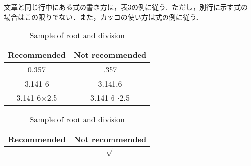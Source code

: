 \documentclass[a4paper, 10pt, dvips, fleqn]{jsarticle}
\begin{document}
文章と同じ行中にある式の書き方は，表3の例に従う．ただし，別行に示す式の
場合はこの限りでない．また，カッコの使い方は式の例に従う．

  \begin{table}[!hb]
   \begin{minipage}[c]{0.49\columnwidth}
    \centering
    \caption{Sample of expression of values}
    \begin{tabular}[t]{|c|c|}
     \hline
     Recommended & Not recommended \\ 
     \hline
     0.357 & .357 \\
     \hline
     3.141 6 & 3.141,6 \\
     \hline
     3.141 6×2.5 & 3.141 6 $\cdot$2.5 \\
     \hline
    \end{tabular}
   \end{minipage}
   \begin{minipage}[c]{0.49\columnwidth}
    \centering
    \caption{Sample of root and division}
    \begin{tabular}[t]{|c|c|}
     \hline
     Recommended & Not recommended\\
     \hline
      & $\sqrt{}$ \\
     \hline
      &  \\
     \hline
    \end{tabular}
   \end{minipage}
   \end{table}
\end{document}
